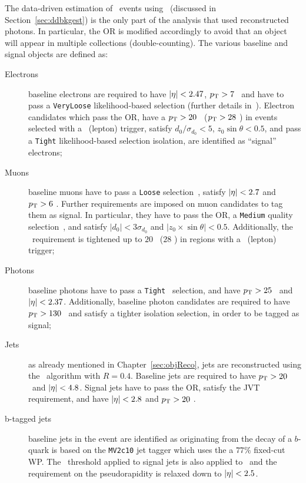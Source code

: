 		The data-driven estimation of \ttZ\ events using \ttgamma\ (discussed in Section~\ref{sec:ddbkgest}) is the only part of the analysis that used reconstructed photons. In particular, the \ac{OR} is modified accordingly to avoid that an object will appear in multiple collections (double-counting). The various baseline and signal objects are defined as:

		\begin{description}
			\item[Electrons] 
				baseline electrons are required to have $|\eta| < 2.47$, $p_{\mathrm{T}} > 7$ \GeV\ and have to pass a \texttt{VeryLoose} likelihood-based selection (further details in~\cite{egamma, egamma2}). Electron candidates which pass the \ac{OR}, have a $p_{\mathrm{T}} > 20$ \gev\ ($p_{\mathrm{T}} > 28$ \GeV) in events selected with a \met\ (lepton) trigger, satisfy $d_0/\sigma_{d_{0}} < 5$, $z_0 \sin \theta < 0.5$, and pass a \texttt{Tight} likelihood-based selection isolation, are identified as ``signal'' electrons;

			\item[Muons] 	
				baseline muons have to pass a \texttt{Loose} selection~\cite{PERF-2015-10}, satisfy $|\eta| < 2.7$ and $p_{\mathrm{T}} > 6$ \GeV. Further requirements are imposed on muon candidates to tag them as signal. In particular, they have to pass the \ac{OR}, a \texttt{Medium} quality selection~\cite{PERF-2015-10}, and satisfy
				$|d_0|< 3 \sigma_{d_0}$ and $|z_0 \times \sin \theta |<0.5$. Additionally, the \pt\ requirement is tightened up to $20$ \gev\ ($28$ \GeV) in regions with a \met\ (lepton) trigger;

			\item[Photons]
				baseline photons have to pass a \texttt{Tight}~\cite{Aaboud:2016yuq} selection, and have $p_{\mathrm{T}} > 25$ \GeV\ and $|\eta| < 2.37$. Additionally, baseline photon candidates are required to have $p_{\mathrm{T}} > 130$ \GeV\ and satisfy a tighter isolation selection, in order to be tagged as signal;
			
			\item[Jets]
				as already mentioned in Chapter~\ref{sec:objReco}, jets are reconstructed using the \antikt\ algorithm with $R=0.4$. Baseline jets are required to have $p_{\mathrm{T}}>20$ \GeV\ and $|\eta|< 4.8$. Signal jets have to pass the \ac{OR}, satisfy the \ac{JVT} requirement, and have $|\eta| < 2.8$ and $p_{\mathrm{T}} > 20$ \GeV. 

			\item[b-tagged jets]
				baseline jets in the event are identified as originating from the decay of a $b$-quark is based on the \texttt{MV2c10} jet tagger which uses the a $77\%$ fixed-cut WP. The \pt\ threshold applied to signal jets is also applied to \bj\ and the requirement on the pseudorapidity is relaxed down to $|\eta| < 2.5$.
			

\end{description}
